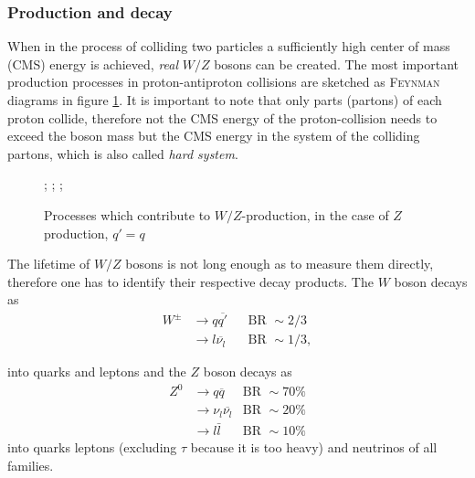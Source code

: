 \documentclass[11pt,a4paper,notitlepage]{scrartcl}
\begin{document}
\subsubsection{Production and decay}
When in the process of colliding two particles a sufficiently high center of mass (CMS) energy is achieved, \emph{real} $W/Z$ bosons can be created. The most important production processes in proton-antiproton collisions are sketched as \textsc{Feynman} diagrams in figure \ref{fig:feyn}. It is important to note that only parts (partons) of each proton collide, therefore not the CMS energy of the proton-collision needs to exceed the boson mass but the CMS energy in the system of the colliding partons, which is also called \emph{hard system}. \cite{manual}
\begin{figure}[htbp]
	\centering
{};
;
;
	\caption{Processes which contribute to $W/Z$-production, in the case of $Z$ production, $q'=q$}
	\label{fig:feyn}
\end{figure}
The lifetime of $W/Z$ bosons is not long enough as to measure them directly, therefore one has to identify their respective decay products. The $W$ boson decays as 
\begin{align*}
	W^\pm & \to q \overline{q'} && \text{BR } \sim 2/3 \\
	& \to l \overline{\nu_l} && \text{BR } \sim 1/3,
\end{align*}

into quarks and leptons and the $Z$ boson decays as
\begin{align*}
	Z^0 & \to q \overline{q} & \text{BR } \sim 70\% \\
	& \to \nu_l \overline{\nu_l} & \text{BR } \sim 20\%\\
	&\to l\bar{l} & \text{BR } \sim 10\% 
\end{align*}
into quarks leptons (excluding $\tau$ because it is too heavy) and neutrinos of all families.
\cite{pdg}
\end{document}
